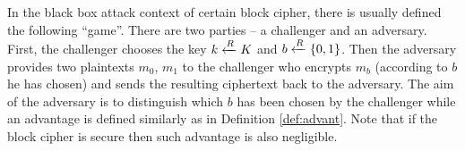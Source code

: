 In the black box attack context of certain block cipher, there is usually defined the following ``game''. There are two parties -- a challenger and an adversary. First, the challenger chooses the key $k\xleftarrow{R} K$ and $b\xleftarrow{R}\{0,1\}$. Then the adversary provides two plaintexts $m_0$, $m_1$ to the challenger who encrypts $m_b$ (according to $b$ he has chosen) and sends the resulting ciphertext back to the adversary. The aim of the adversary is to distinguish which $b$ has been chosen by the challenger while an advantage is defined similarly as in Definition \ref{def:advant}. Note that if the block cipher is secure then such advantage is also negligible.


\begin{defn}
	
\end{defn}

\begin{defn}
	
\end{defn}





	








